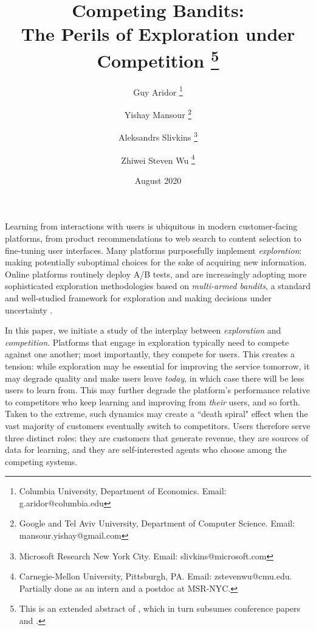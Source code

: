 \documentclass[10pt]{article}
\newcommand{\termTXT}[1]{{\em {#1}}\xspace}
\newcommand{\competition}{\termTXT{competition}}
\newcommand{\exploration}{\termTXT{exploration}}
\begin{document}

\title{Competing Bandits:\\
The Perils of Exploration under Competition%
\thanks{This is an extended abstract of \citet{CompetingBandits-merged}, which in turn subsumes conference papers
\citet{CompetingBandits-itcs18} and \citet{CompetingBandits-ec19}.}}

\author{Guy Aridor%
\footnote{Columbia University, Department of Economics. Email: g.aridor@columbia.edu}
\and
Yishay Mansour%
\footnote{Google and Tel Aviv University, Department of Computer Science. Email: mansour.yishay@gmail.com}
\and
Aleksandrs Slivkins%
\footnote{Microsoft Research New York City. Email: slivkins@microsoft.com}
\and
Zhiwei Steven Wu%
\footnote{Carnegie-Mellon University, Pittsburgh, PA.
Email: zstevenwu@cmu.edu.
Partially done as an intern and a postdoc at MSR-NYC.
}}
\date{August 2020}
\maketitle

Learning from interactions with users is ubiquitous in modern customer-facing platforms, from product recommendations to web search to content selection to fine-tuning user interfaces. Many platforms purposefully implement \emph{exploration}: making potentially suboptimal choices for the sake of acquiring new information.
Online platforms routinely deploy A/B tests, and are increasingly adopting  more sophisticated exploration methodologies based on \emph{multi-armed bandits}, a standard and well-studied framework for exploration and making decisions under uncertainty
\citep{Gittins-book11,Bubeck-survey12,slivkins-MABbook,LS19bandit-book}.


In this paper, we initiate a study of the interplay between \exploration and \competition. Platforms that engage in exploration typically need to compete against one another; most importantly, they compete for users. This creates a tension:
while exploration may be essential for improving the service tomorrow, it may degrade quality and make users leave \emph{today}, in which case there will be less users to learn from. This may further degrade the platform's performance relative to competitors who keep learning and improving from \emph{their} users, and so forth. Taken to the extreme, such dynamics may create a ``death spiral" effect when the vast majority of customers eventually switch to competitors. Users therefore serve three distinct roles: they are customers that generate revenue, they are sources of data for learning, and they are self-interested agents who choose among the competing systems.
\end{document}
